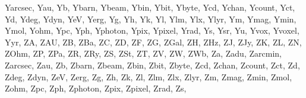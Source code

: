 \documentclass[letterpaper,10pt,english]{sphinxmanual}
\begin{document}
\begin{sphinxVerbatim}[commandchars=\\\{\}]
 \PYGZsq{}Yarcsec\PYGZsq{},
 \PYGZsq{}Yau\PYGZsq{},
 \PYGZsq{}Yb\PYGZsq{},
 \PYGZsq{}Ybarn\PYGZsq{},
 \PYGZsq{}Ybeam\PYGZsq{},
 \PYGZsq{}Ybin\PYGZsq{},
 \PYGZsq{}Ybit\PYGZsq{},
 \PYGZsq{}Ybyte\PYGZsq{},
 \PYGZsq{}Ycd\PYGZsq{},
 \PYGZsq{}Ychan\PYGZsq{},
 \PYGZsq{}Ycount\PYGZsq{},
 \PYGZsq{}Yct\PYGZsq{},
 \PYGZsq{}Yd\PYGZsq{},
 \PYGZsq{}Ydeg\PYGZsq{},
 \PYGZsq{}Ydyn\PYGZsq{},
 \PYGZsq{}YeV\PYGZsq{},
 \PYGZsq{}Yerg\PYGZsq{},
 \PYGZsq{}Yg\PYGZsq{},
 \PYGZsq{}Yh\PYGZsq{},
 \PYGZsq{}Yk\PYGZsq{},
 \PYGZsq{}Yl\PYGZsq{},
 \PYGZsq{}Ylm\PYGZsq{},
 \PYGZsq{}Ylx\PYGZsq{},
 \PYGZsq{}Ylyr\PYGZsq{},
 \PYGZsq{}Ym\PYGZsq{},
 \PYGZsq{}Ymag\PYGZsq{},
 \PYGZsq{}Ymin\PYGZsq{},
 \PYGZsq{}Ymol\PYGZsq{},
 \PYGZsq{}Yohm\PYGZsq{},
 \PYGZsq{}Ypc\PYGZsq{},
 \PYGZsq{}Yph\PYGZsq{},
 \PYGZsq{}Yphoton\PYGZsq{},
 \PYGZsq{}Ypix\PYGZsq{},
 \PYGZsq{}Ypixel\PYGZsq{},
 \PYGZsq{}Yrad\PYGZsq{},
 \PYGZsq{}Ys\PYGZsq{},
 \PYGZsq{}Ysr\PYGZsq{},
 \PYGZsq{}Yu\PYGZsq{},
 \PYGZsq{}Yvox\PYGZsq{},
 \PYGZsq{}Yvoxel\PYGZsq{},
 \PYGZsq{}Yyr\PYGZsq{},
 \PYGZsq{}ZA\PYGZsq{},
 \PYGZsq{}ZAU\PYGZsq{},
 \PYGZsq{}ZB\PYGZsq{},
 \PYGZsq{}ZBa\PYGZsq{},
 \PYGZsq{}ZC\PYGZsq{},
 \PYGZsq{}ZD\PYGZsq{},
 \PYGZsq{}ZF\PYGZsq{},
 \PYGZsq{}ZG\PYGZsq{},
 \PYGZsq{}ZGal\PYGZsq{},
 \PYGZsq{}ZH\PYGZsq{},
 \PYGZsq{}ZHz\PYGZsq{},
 \PYGZsq{}ZJ\PYGZsq{},
 \PYGZsq{}ZJy\PYGZsq{},
 \PYGZsq{}ZK\PYGZsq{},
 \PYGZsq{}ZL\PYGZsq{},
 \PYGZsq{}ZN\PYGZsq{},
 \PYGZsq{}ZOhm\PYGZsq{},
 \PYGZsq{}ZP\PYGZsq{},
 \PYGZsq{}ZPa\PYGZsq{},
 \PYGZsq{}ZR\PYGZsq{},
 \PYGZsq{}ZRy\PYGZsq{},
 \PYGZsq{}ZS\PYGZsq{},
 \PYGZsq{}ZSt\PYGZsq{},
 \PYGZsq{}ZT\PYGZsq{},
 \PYGZsq{}ZV\PYGZsq{},
 \PYGZsq{}ZW\PYGZsq{},
 \PYGZsq{}ZWb\PYGZsq{},
 \PYGZsq{}Za\PYGZsq{},
 \PYGZsq{}Zadu\PYGZsq{},
 \PYGZsq{}Zarcmin\PYGZsq{},
 \PYGZsq{}Zarcsec\PYGZsq{},
 \PYGZsq{}Zau\PYGZsq{},
 \PYGZsq{}Zb\PYGZsq{},
 \PYGZsq{}Zbarn\PYGZsq{},
 \PYGZsq{}Zbeam\PYGZsq{},
 \PYGZsq{}Zbin\PYGZsq{},
 \PYGZsq{}Zbit\PYGZsq{},
 \PYGZsq{}Zbyte\PYGZsq{},
 \PYGZsq{}Zcd\PYGZsq{},
 \PYGZsq{}Zchan\PYGZsq{},
 \PYGZsq{}Zcount\PYGZsq{},
 \PYGZsq{}Zct\PYGZsq{},
 \PYGZsq{}Zd\PYGZsq{},
 \PYGZsq{}Zdeg\PYGZsq{},
 \PYGZsq{}Zdyn\PYGZsq{},
 \PYGZsq{}ZeV\PYGZsq{},
 \PYGZsq{}Zerg\PYGZsq{},
 \PYGZsq{}Zg\PYGZsq{},
 \PYGZsq{}Zh\PYGZsq{},
 \PYGZsq{}Zk\PYGZsq{},
 \PYGZsq{}Zl\PYGZsq{},
 \PYGZsq{}Zlm\PYGZsq{},
 \PYGZsq{}Zlx\PYGZsq{},
 \PYGZsq{}Zlyr\PYGZsq{},
 \PYGZsq{}Zm\PYGZsq{},
 \PYGZsq{}Zmag\PYGZsq{},
 \PYGZsq{}Zmin\PYGZsq{},
 \PYGZsq{}Zmol\PYGZsq{},
 \PYGZsq{}Zohm\PYGZsq{},
 \PYGZsq{}Zpc\PYGZsq{},
 \PYGZsq{}Zph\PYGZsq{},
 \PYGZsq{}Zphoton\PYGZsq{},
 \PYGZsq{}Zpix\PYGZsq{},
 \PYGZsq{}Zpixel\PYGZsq{},
 \PYGZsq{}Zrad\PYGZsq{},
 \PYGZsq{}Zs\PYGZsq{},

\end{sphinxVerbatim}
\end{document}
